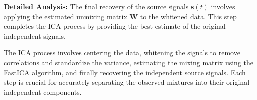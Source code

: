 \documentclass{exam}
\begin{document}
\textbf{Detailed Analysis:} The final recovery of the source signals \( \mathbf{s}(t) \) involves applying the estimated unmixing matrix \( \mathbf{W} \) to the whitened data. This step completes the ICA process by providing the best estimate of the original independent signals.

The ICA process involves centering the data, whitening the signals to remove correlations and standardize the variance, estimating the mixing matrix using the FastICA algorithm, and finally recovering the independent source signals. Each step is crucial for accurately separating the observed mixtures into their original independent components.
\end{document}
